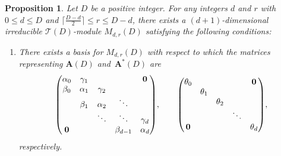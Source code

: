 \documentclass[pdftex]{sigma}%
\def\A{\mathbf A}
\def\T{\mathcal T}
\numberwithin{equation}{section}
\newtheorem{Proposition}[Theorem]{Proposition}
 { \theoremstyle{definition}
\newtheorem{Definition}[Theorem]{Definition}
\newtheorem{Note}[Theorem]{Note}
\newtheorem{Example}[Theorem]{Example}
\newtheorem{Remark}[Theorem]{Remark} }
\begin{document}
\begin{Proposition}\label{prop2:Kpk}
Let $D$ be a positive integer.
For any integers $d$ and $r$ with $0\leq d\leq D$ and $\big\lceil \frac{D-d}{2}\big\rceil\leq r\leq D-d$, there exists a $(d+1)$-dimensional irreducible $\T(D)$-module $M_{d,r}(D)$ satisfying the following conditions:
\begin{enumerate}\itemsep=0pt
\item[$(i)$] There exists a basis for $M_{d,r}(D)$ with respect to which the matrices representing $\A(D)$ and~$\A^*(D)$ are
\begin{gather*}
\begin{pmatrix}
\alpha_0 &\gamma_1 & & &{\bf 0}
\\
\beta_0 &\alpha_1 &\gamma_2
\\
&\beta_1 &\alpha_2 &\ddots
 \\
& &\ddots &\ddots &\gamma_d
 \\
{\bf 0} & & &\beta_{d-1} &\alpha_d
\end{pmatrix}\!,
\qquad
\begin{pmatrix}
\theta_0 & & & &{\bf 0}
\\
 &\theta_1
\\
 & &\theta_2
 \\
 & & &\ddots
 \\
{\bf 0} & & & &\theta_d
\end{pmatrix}\!,
\end{gather*}
respectively.


\end{enumerate}
\end{Proposition}
\end{document}
